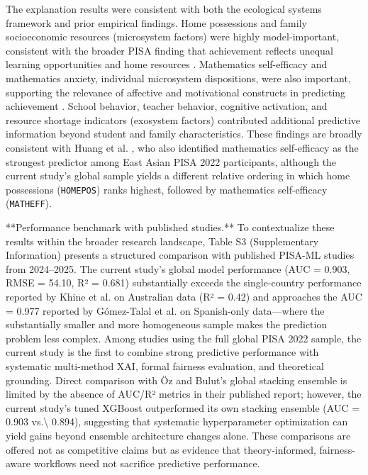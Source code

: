 \documentclass[pdflatex,sn-mathphys-ay]{sn-jnl}
\begin{document}
The explanation results were consistent with both the ecological systems framework and prior empirical findings. Home possessions and family socioeconomic resources (microsystem factors) were highly model-important, consistent with the broader PISA finding that achievement reflects unequal learning opportunities and home resources \citep{OECD_2022_results_vol1}. Mathematics self-efficacy and mathematics anxiety, individual microsystem dispositions, were also important, supporting the relevance of affective and motivational constructs in predicting achievement \citep{OECD_2022_results_vol5}. School behavior, teacher behavior, cognitive activation, and resource shortage indicators (exosystem factors) contributed additional predictive information beyond student and family characteristics. These findings are broadly consistent with Huang et al. \citep{Huang_2024}, who also identified mathematics self-efficacy as the strongest predictor among East Asian PISA 2022 participants, although the current study's global sample yields a different relative ordering in which home possessions (\texttt{HOMEPOS}) ranks highest, followed by mathematics self-efficacy (\texttt{MATHEFF}).

**Performance benchmark with published studies.** To contextualize these results within the broader research landscape, Table S3 (Supplementary Information) presents a structured comparison with published PISA-ML studies from 2024--2025. The current study's global model performance (AUC = 0.903, RMSE = 54.10, R² = 0.681) substantially exceeds the single-country performance reported by Khine et al. \citep{Khine_2024} on Australian data (R² = 0.42) and approaches the AUC = 0.977 reported by Gómez-Talal et al. \citep{Gomez_Talal_2025} on Spanish-only data---where the substantially smaller and more homogeneous sample makes the prediction problem less complex. Among studies using the full global PISA 2022 sample, the current study is the first to combine strong predictive performance with systematic multi-method XAI, formal fairness evaluation, and theoretical grounding. Direct comparison with Öz and Bulut's \citep{Oz_Bulut_2025_stacking} global stacking ensemble is limited by the absence of AUC/R² metrics in their published report; however, the current study's tuned XGBoost outperformed its own stacking ensemble (AUC = 0.903 vs.\textbackslash{} 0.894), suggesting that systematic hyperparameter optimization can yield gains beyond ensemble architecture changes alone. These comparisons are offered not as competitive claims but as evidence that theory-informed, fairness-aware workflows need not sacrifice predictive performance.
\end{document}
